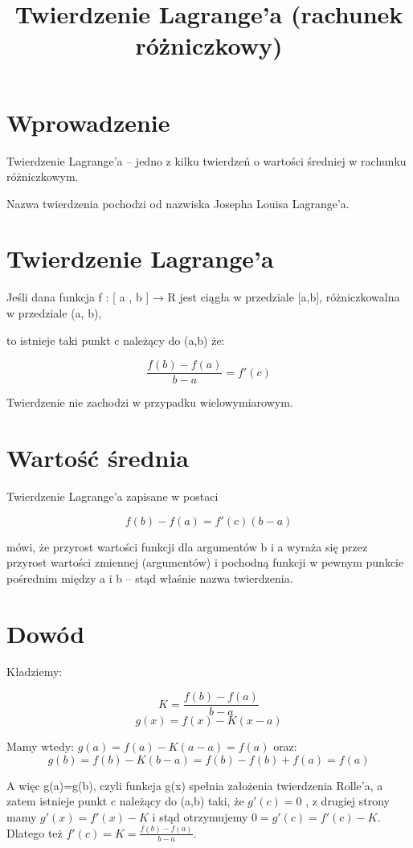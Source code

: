 \documentclass{article}
\begin{document}
\title{Twierdzenie Lagrange’a (rachunek różniczkowy)}
\maketitle

\section*{Wprowadzenie}
Twierdzenie Lagrange’a – jedno z kilku twierdzeń o wartości średniej w rachunku różniczkowym.

Nazwa twierdzenia pochodzi od nazwiska Josepha Louisa Lagrange’a.

\section*{Twierdzenie Lagrange'a}
Jeśli dana funkcja f : [ a , b ] → R jest ciągła w przedziale [a,b], różniczkowalna w przedziale (a, b),

to istnieje taki punkt c należący do (a,b)  że:

\begin{equation}
	{\frac {f(b)-f(a)}{b-a}}=f'(c)
\end{equation}

Twierdzenie nie zachodzi w przypadku wielowymiarowym. 

\section*{Wartość średnia}

Twierdzenie Lagrange’a zapisane w postaci

\begin{displaymath}
	f(b)-f(a)=f'(c)(b-a)
\end{displaymath}

mówi, że przyrost wartości funkcji dla argumentów b i a wyraża się przez przyrost wartości zmiennej (argumentów) i pochodną funkcji w pewnym punkcie pośrednim między a i b – stąd właśnie nazwa twierdzenia. 

\section*{Dowód}
Kładziemy:

$$ K={\frac {f(b)-f(a)}{b-a}} $$
$$ g(x)=f(x)-K(x-a) $$

Mamy wtedy: \(g(a)=f(a)-K(a-a)=f(a)\) 
oraz: \[g(b)=f(b)-K(b-a)=f(b)-f(b)+f(a)=f(a)\]

A więc g(a)=g(b), czyli funkcja g(x) spełnia założenia twierdzenia Rolle’a, a zatem istnieje punkt c należący do (a,b) taki, że $g' (c)=0$ , z drugiej strony mamy \(g'(x)=f'(x)-K\) i stąd otrzymujemy \(0=g'(c)=f'(c)-K\). Dlatego też $f'(c)=K={\frac {f(b)-f(a)}{b-a}}$. 
\end{document}
